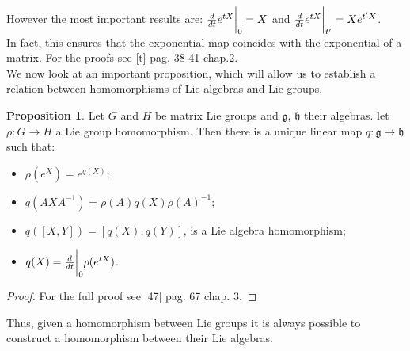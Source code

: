 \documentclass[12pt,a4paper]{report}
\theoremstyle{definition}
\theoremstyle{Theorem}
\newtheorem{Prop}[Def]{Proposition}
\theoremstyle{definition}
\theoremstyle{definition}
\begin{document}
	However the most important results are: ${d\over dt}e^{tX}\bigg{\rvert}_0=X$ and ${d\over dt}e^{tX}\bigg{\rvert}_{t'}=Xe^{t'X}$.\\
	In fact, this ensures that the exponential map coincides with the exponential of a matrix. For the proofs see [t] pag. 38-41 chap.2.\\
	We now look at an important proposition, which will allow us to establish a relation between homomorphisms of Lie algebras and Lie groups.
	\begin{Prop} \label{Prop: 2.4.1}
		Let $G$ and $H$ be matrix Lie groups and $\mathfrak{g}$, $\mathfrak{h}$ their algebras. let $\rho:G\rightarrow H$ a Lie group homomorphism. Then there is a unique linear map $q:\mathfrak{g}\rightarrow\mathfrak{h}$ such that:
		\begin{itemize}
			\item $\rho(e^X)=e^{q(X)}$; 
			\item $q(AXA^{-1})=\rho(A)q(X)\rho(A)^{-1}$;
			\item $q([X,Y])=[q(X),q(Y)]$, is a Lie algebra homomorphism;
			\item $q(X)={d\over dt}\bigg{\rvert}_0\rho(e^{tX})$.
		\end{itemize}
	\end{Prop}
	\begin{proof}
		For the full proof see [47] pag. 67 chap. 3.
	\end{proof}
	Thus, given a homomorphism between Lie groups it is always possible to construct a homomorphism between their Lie algebras.
\end{document}

